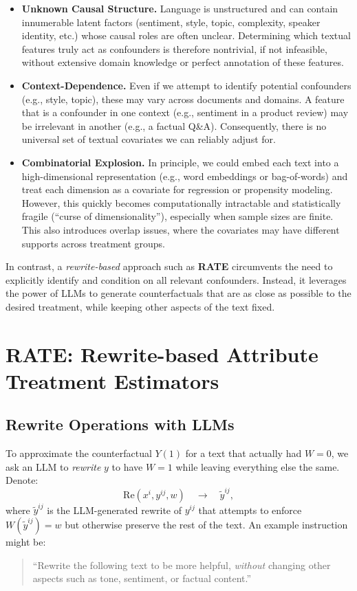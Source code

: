 \documentclass{article}
\theoremstyle{definition}
\begin{document}
\begin{itemize}
    \item \textbf{Unknown Causal Structure.} Language is unstructured and can contain innumerable latent factors (sentiment, style, topic, complexity, speaker identity, etc.) whose causal roles are often unclear. Determining which textual features truly act as confounders is therefore nontrivial, if not infeasible, without extensive domain knowledge or perfect annotation of these features.

    \item \textbf{Context-Dependence.} Even if we attempt to identify potential confounders (e.g., style, topic), these may vary across documents and domains. A feature that is a confounder in one context (e.g., sentiment in a product review) may be irrelevant in another (e.g., a factual Q\&A). Consequently, there is no universal set of textual covariates we can reliably adjust for.

    \item \textbf{Combinatorial Explosion.} In principle, we could embed each text into a high-dimensional representation (e.g., word embeddings or bag-of-words) and treat each dimension as a covariate for regression or propensity modeling. However, this quickly becomes computationally intractable and statistically fragile (``curse of dimensionality''), especially when sample sizes are finite. This also introduces overlap issues, where the covariates may have different supports across treatment groups.

\end{itemize}

In contrast, a \emph{rewrite-based} approach such as \textbf{RATE} circumvents the need to explicitly identify and condition on all relevant confounders. Instead, it leverages the power of LLMs to generate counterfactuals that are as close as possible to the desired treatment, while keeping other aspects of the text fixed.

\section{RATE: Rewrite-based Attribute Treatment Estimators}
\label{sec:rate}

\subsection{Rewrite Operations with LLMs}
To approximate the counterfactual $Y(1)$ for a text that actually had $W=0$, we ask an LLM to \emph{rewrite} $y$ to have $W=1$ while leaving everything else the same. Denote:
\[
\text{Re}(x^i, y^{ij}, w) \quad\longrightarrow\quad \tilde{y}^{ij},
\]
where $\tilde{y}^{ij}$ is the LLM-generated rewrite of $y^{ij}$ that attempts to enforce $W(\tilde{y}^{ij}) = w$ but otherwise preserve the rest of the text. An example instruction might be:  
\begin{quote}
``Rewrite the following text to be more helpful, \textit{without} changing other aspects such as tone, sentiment, or factual content.''  
\end{quote}
\end{document}
